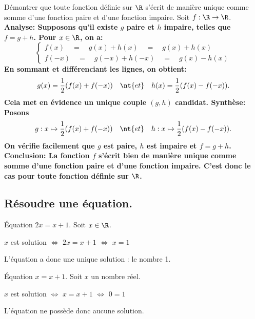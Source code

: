 \documentclass[11pt]{article}
\begin{document}
\begin{ex}{}{}
    Démontrer que toute fonction définie sur $\R$ s'écrit de manière unique comme somme d'une fonction paire et d'une fonction impaire.
    \tcblower
    Soit $f:\R\to\R$.\\
    \bf{Analyse:} Supposons qu'il existe $g$ paire et $h$ impaire, telles que $f=g+h$. Pour $x\in\R$, on a:
    \begin{equation*}
        \begin{cases}
            f(x)\quad=\quad g(x)+h(x)\quad=\quad g(x)+h(x)\\
            f(-x)\quad=\quad g(-x)+h(-x)\quad=\quad g(x)-h(x)
        \end{cases}
    \end{equation*}
    En sommant et différenciant les lignes, on obtient:
    \begin{equation*}
        g(x)=\frac{1}{2}(f(x)+f(-x))\quad\nt{et}\quad h(x)=\frac{1}{2}(f(x)-f(-x)).
    \end{equation*}
    Cela met en évidence un unique couple $(g,h)$ candidat.\n
    \bf{Synthèse:} Posons
    \begin{equation*}
        g:x\mapsto\frac{1}{2}(f(x)+f(-x))\quad\nt{et}\quad h:x\mapsto\frac{1}{2}(f(x)-f(-x)).
    \end{equation*}
    On vérifie facilement que $g$ est paire, $h$ est impaire et $f=g+h$.\n
    \bf{Conclusion:} La fonction $f$ s'écrit bien de manière unique comme somme d'une fonction paire et d'une fonction impaire. C'est donc le cas pour toute fonction définie sur $\R$.
\end{ex}

\subsection{Résoudre une équation.}

\begin{ex}{Équation $2x=x+1$.}{}
    Soit $x\in\R$.
    \begin{center}
        $x$ est solution $\iff$ $2x=x+1$ $\iff$ $x=1$
    \end{center}
    L'équation a donc une unique solution : le nombre 1.
\end{ex}

\begin{ex}{Équation $x=x+1$.}{}
    Soit $x$ un nombre réel.
    \begin{center}
        $x$ est solution $\iff$ $x=x+1$ $\iff$ $0=1$
    \end{center}
    L'équation ne possède donc aucune solution.
\end{ex}
\end{document}
